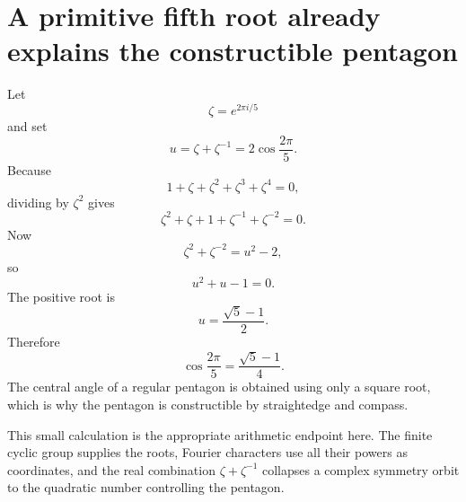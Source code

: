 \section{A primitive fifth root already explains the constructible pentagon}

Let
\[
  \zeta=e^{2\pi i/5}
\]
and set
\[
  u=\zeta+\zeta^{-1}
  =2\cos\frac{2\pi}{5}.
\]
Because
\[
  1+\zeta+\zeta^2+\zeta^3+\zeta^4=0,
\]
dividing by \(\zeta^2\) gives
\[
  \zeta^2+\zeta+1+\zeta^{-1}+\zeta^{-2}=0.
\]
Now
\[
  \zeta^2+\zeta^{-2}=u^2-2,
\]
so
\[
  u^2+u-1=0.
\]
The positive root is
\[
  u=\frac{\sqrt5-1}{2}.
\]
Therefore
\[
  \cos\frac{2\pi}{5}
  =\frac{\sqrt5-1}{4}.
\]
The central angle of a regular pentagon is obtained using only a square root, which is why the pentagon is constructible by straightedge and compass.

This small calculation is the appropriate arithmetic endpoint here.  The finite cyclic group supplies the roots, Fourier characters use all their powers as coordinates, and the real combination \(\zeta+\zeta^{-1}\) collapses a complex symmetry orbit to the quadratic number controlling the pentagon.